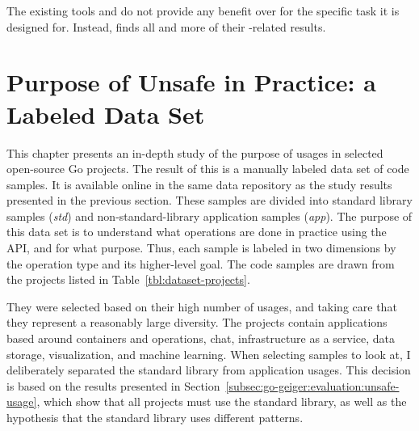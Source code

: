 \begin{tcolorbox}[boxsep=3pt, enlarge top by=5pt, title=Answer to~\ref{rq:linterComparison}]
    The existing tools \toolVet{} and \toolGosec{} do not provide any benefit over \toolGeiger{} for the specific task
    it is designed for.
    Instead, \toolGeiger{} finds all and more of their \unsafe{}-related results.
\end{tcolorbox}



\section{Purpose of Unsafe in Practice: a Labeled Data Set}\label{sec:go-geiger:labeled-dataset}

This chapter presents an in-depth study of the purpose of \unsafe{} usages in \projsForLabeledCodeSnippets{} selected
open-source Go projects.
The result of this is a manually labeled data set of \numberLabeledCodeSnippets{} code samples.
It is available online in the same data repository as the study results presented in the previous section.
These samples are divided into \numberLabeledCodeSnippetsStd{} standard library samples (\textit{std}) and
\numberLabeledCodeSnippetsApp{} non-standard-library application samples (\textit{app}).
The purpose of this data set is to understand what operations are done in practice using the \unsafe{} \acrshort{API},
and for what purpose.
Thus, each sample is labeled in two dimensions by the operation type and its higher-level goal.
The \numberLabeledCodeSnippets{} code samples are drawn from the projects listed in Table~\ref{tbl:dataset-projects}.



They were selected based on their high number of \unsafe{} usages, and taking care that they represent a reasonably
large diversity.
The projects contain applications based around containers and operations, chat, infrastructure as a service, data
storage, visualization, and machine learning.
When selecting samples to look at, I deliberately separated the standard library from application usages.
This decision is based on the results presented in Section~\ref{subsec:go-geiger:evaluation:unsafe-usage}, which show
that all projects must use the standard library, as well as the hypothesis that the standard library uses different
\unsafe{} patterns.

